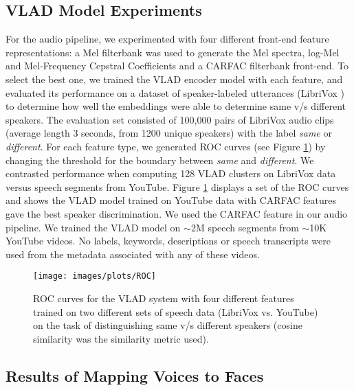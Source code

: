 \documentclass[a4paper]{article}
\begin{document}
\subsection{VLAD Model Experiments}
\label{subsec:vladexpt}

For the audio pipeline, we experimented with four different front-end feature representations: a Mel filterbank \cite{Ste37} was used to generate the Mel spectra, log-Mel and Mel-Frequency Cepstral Coefficients and a CARFAC filterbank \cite{Lyo11} front-end. To select the best one, we trained the VLAD encoder model with each feature, and evaluated its performance on a dataset of speaker-labeled utterances (LibriVox \cite{Lvo}) to determine how well the embeddings were able to determine same v/s different speakers. The evaluation set consisted of 100,000 pairs of LibriVox audio clips (average length 3 seconds, from 1200 unique speakers) with the label {\it same} or {\it different}. For each feature type, we generated ROC curves (see Figure \ref{fig:rocplot}) by changing the threshold for the boundary between {\it same} and {\it different}. We contrasted performance when computing 128 VLAD clusters on LibriVox data versus speech segments from YouTube. Figure \ref{fig:rocplot} displays a set of the ROC curves and shows the VLAD model trained on YouTube data with CARFAC features gave the best speaker discrimination.
We used the CARFAC feature in our audio pipeline.
We trained the VLAD model on $\sim$2M speech segments from $\sim$10K YouTube videos. No labels, keywords, descriptions or speech transcripts were used from the metadata associated with any of these videos. 


\begin{figure}[t]
  \texttt{[image: images/plots/ROC]}
  \caption{ROC curves for the VLAD system with four different features trained on two different sets of speech data (LibriVox vs. YouTube) on the task of distinguishing same v/s different speakers (cosine similarity was the similarity metric used).}
  \label{fig:rocplot}
\end{figure}

\subsection{Results of Mapping Voices to Faces}
\label{subsec:mapdiscuss}
\end{document}
